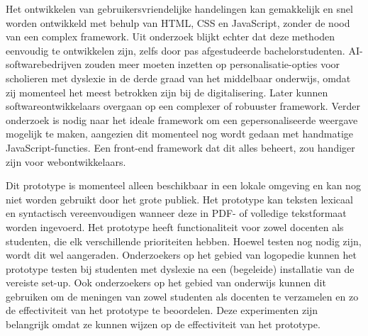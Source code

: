 \medspace

Het ontwikkelen van gebruikersvriendelijke handelingen kan gemakkelijk en snel worden ontwikkeld met behulp van HTML, CSS en JavaScript, zonder de nood van een complex framework. Uit onderzoek blijkt echter dat deze methoden eenvoudig te ontwikkelen zijn, zelfs door pas afgestudeerde bachelorstudenten. AI-softwarebedrijven zouden meer moeten inzetten op personalisatie-opties voor scholieren met dyslexie in de derde graad van het middelbaar onderwijs, omdat zij momenteel het meest betrokken zijn bij de digitalisering. Later kunnen softwareontwikkelaars overgaan op een complexer of robuuster framework. Verder onderzoek is nodig naar het ideale framework om een gepersonaliseerde weergave mogelijk te maken, aangezien dit momenteel nog wordt gedaan met handmatige JavaScript-functies. Een front-end framework dat dit alles beheert, zou handiger zijn voor webontwikkelaars.

\medspace

Dit prototype is momenteel alleen beschikbaar in een lokale omgeving en kan nog niet worden gebruikt door het grote publiek. Het prototype kan teksten lexicaal en syntactisch vereenvoudigen wanneer deze in PDF- of volledige tekstformaat worden ingevoerd. Het prototype heeft functionaliteit voor zowel docenten als studenten, die elk verschillende prioriteiten hebben. Hoewel testen nog nodig zijn, wordt dit wel aangeraden. Onderzoekers op het gebied van logopedie kunnen het prototype testen bij studenten met dyslexie na een (begeleide) installatie van de vereiste set-up. Ook onderzoekers op het gebied van onderwijs kunnen dit gebruiken om de meningen van zowel studenten als docenten te verzamelen en zo de effectiviteit van het prototype te beoordelen. Deze experimenten zijn belangrijk omdat ze kunnen wijzen op de effectiviteit van het prototype.

